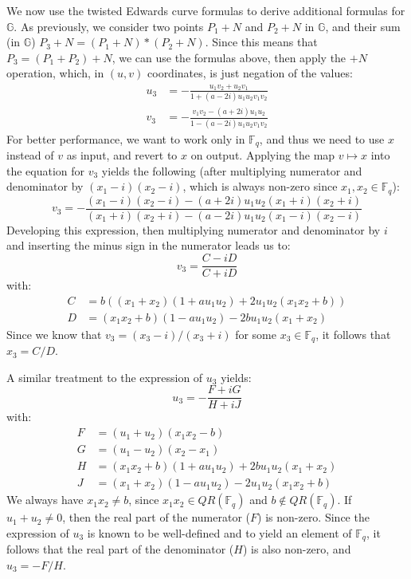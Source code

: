 \documentclass{llncs}
\newcommand{\QR}{QR}
\newcommand{\bF}{\mathbb{F}}
\newcommand{\bG}{\mathbb{G}}
\begin{document}
We now use the twisted Edwards curve formulas to derive additional
formulas for $\bG$. As previously, we consider two points $P_1+N$ and
$P_2+N$ in $\bG$, and their sum (in $\bG$) $P_3+N = (P_1+N)*(P_2+N)$.
Since this means that $P_3 = (P_1+P_2)+N$, we can use the formulas
above, then apply the $+N$ operation, which, in $(u,v)$ coordinates,
is just negation of the values:
\begin{align*}
    u_3 &= -\frac{u_1 v_2 + u_2 v_1}{1 + (a - 2i) u_1 u_2 v_1 v_2} \\
    v_3 &= -\frac{v_1 v_2 - (a + 2i) u_1 u_2}{1 - (a - 2i) u_1 u_2 v_1 v_2}
\end{align*}
For better performance, we want to work only in $\bF_q$, and thus we need
to use $x$ instead of $v$ as input, and revert to $x$ on output. Applying
the map $v \mapsto x$ into the equation for $v_3$ yields the following
(after multiplying numerator and denominator by $(x_1-i)(x_2-i)$, which
is always non-zero since $x_1, x_2 \in \bF_q$):
\begin{equation*}
    v_3 = -\frac{(x_1 - i)(x_2 - i) - (a + 2i) u_1 u_2 (x_1 + i)(x_2 + i)}
                 {(x_1 + i)(x_2 + i) - (a - 2i) u_1 u_2 (x_1 - i)(x_2 - i)}
\end{equation*}
Developing this expression, then multiplying numerator and denominator by
$i$ and inserting the minus sign in the numerator leads us to:
\begin{equation*}
    v_3 = \frac{C - iD}{C + iD}
\end{equation*}
with:
\begin{align*}
    C &= b((x_1 + x_2)(1 + a u_1 u_2) + 2 u_1 u_2 (x_1 x_2 + b)) \\
    D &= (x_1 x_2 + b)(1 - a u_1 u_2) - 2b u_1 u_2 (x_1 + x_2)
\end{align*}
Since we know that $v_3 = (x_3 - i) / (x_3 + i)$ for some $x_3 \in \bF_q$,
it follows that $x_3 = C/D$.

A similar treatment to the expression of $u_3$ yields:
\begin{equation*}
    u_3 = -\frac{F + iG}{H + iJ}
\end{equation*}
with:
\begin{align*}
    F &= (u_1 + u_2)(x_1 x_2 - b) \\
    G &= (u_1 - u_2)(x_2 - x_1) \\
    H &= (x_1 x_2 + b)(1 + a u_1 u_2) + 2b u_1 u_2 (x_1 + x_2) \\
    J &= (x_1 + x_2)(1 - a u_1 u_2) - 2 u_1 u_2 (x_1 x_2 + b)
\end{align*}
We always have $x_1 x_2 \neq b$, since $x_1 x_2 \in \QR(\bF_q)$ and
$b \notin \QR(\bF_q)$. If $u_1 + u_2 \neq 0$, then the real part of
the numerator ($F$) is non-zero. Since the expression of $u_3$ is known to be
well-defined and to yield an element of $\bF_q$, it follows that the
real part of the denominator ($H$) is also non-zero, and $u_3 = -F/H$.
\end{document}
